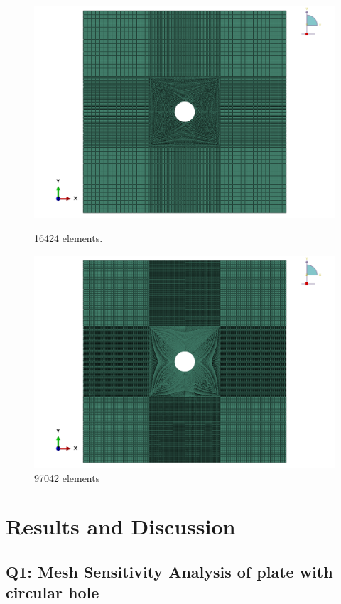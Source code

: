 \documentclass[12pt]{article}
\begin{document}
\begin{figure}[H]
\begin{minipage}{0.24\textwidth}
        \includegraphics[width=\textwidth]{images/Mesh7.png}
        \caption*{16424 elements.}
    \end{minipage}
    \begin{minipage}{0.24\textwidth}
        \centering
        \includegraphics[width=\textwidth]{images/Mesh8.png}
        \caption*{97042 elements}
    \end{minipage}
\end{figure}
\section*{Results and Discussion}

\subsection*{Q1: Mesh Sensitivity Analysis of plate with circular hole}
\end{document}
